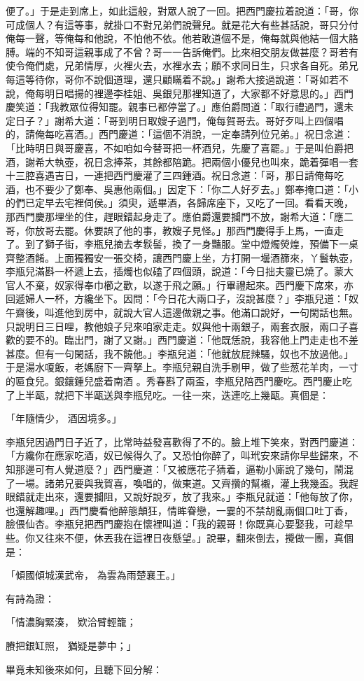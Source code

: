便了。」于是走到席上，如此這般，對眾人說了一回。把西門慶拉着說道：「哥，你可成個人？有這等事，就掛口不對兄弟們說聲兒。就是花大有些甚話說，哥只分付俺每一聲，等俺每和他說，不怕他不依。他若敢道個不是，俺每就與他結一個大胳膊。端的不知哥這親事成了不曾？哥一一告訴俺們。比來相交朋友做甚麼？哥若有使令俺們處，兄弟情厚，火裡火去，水裡水去；願不求同日生，只求各自死。弟兄每這等待你，哥你不說個道理，還只顧瞞着不說。」謝希大接過說道：「哥如若不說，俺每明日唱揚的裡邊李桂姐、吳銀兒那裡知道了，大家都不好意思的。」西門慶笑道：「我教眾位得知罷。親事已都停當了。」應伯爵問道：「取行禮過門，還未定日子？」謝希大道：「哥到明日取嫂子過門，俺每賀哥去。哥好歹叫上四個唱的，請俺每吃喜酒。」西門慶道：「這個不消說，一定奉請列位兄弟。」祝日念道：「比時明日與哥慶喜，不如咱如今替哥把一杯酒兒，先慶了喜罷。」于是叫伯爵把酒，謝希大執壺，祝日念捧茶，其餘都陪跪。把兩個小優兒也叫來，跪着彈唱一套十三腔喜遇吉日，一連把西門慶灌了三四鍾酒。祝日念道：「哥，那日請俺每吃酒，也不要少了鄭奉、吳惠他兩個。」因定下：「你二人好歹去。」鄭奉掩口道：「小的們已定早去宅裡伺侯。」須臾，遞畢酒，各歸席座下，又吃了一回。看看天晚，那西門慶那埋坐的住，趕眼錯起身走了。應伯爵還要攔門不放，謝希大道：「應二哥，你放哥去罷。休要誤了他的事，教嫂子見怪。」那西門慶得手上馬，一直走了。到了獅子街，李瓶兒摘去孝䯼髻，換了一身豔服。堂中燈燭熒煌，預備下一桌齊整酒餚。上面獨獨安一張交椅，讓西門慶上坐，方打開一壜酒篩來，丫鬟執壺，李瓶兒滿斟一杯遞上去，插燭也似磕了四個頭，說道：「今日拙夫靈已燒了。蒙大官人不棄，奴家得奉巾櫛之歡，以遂于飛之願。」行畢禮起來。西門慶下席來，亦回遞婦人一杯，方纔坐下。因問：「今日花大兩口子，沒說甚麼？」李瓶兒道：「奴午齋後，叫進他到房中，就說大官人這邊做親之事。他滿口說好，一句閑話也無。只說明日三日哩，教他娘子兒來咱家走走。奴與他十兩銀子，兩套衣服，兩口子喜歡的要不的。臨出門，謝了又謝。」西門慶道：「他既恁說，我容他上門走走也不差甚麼。但有一句閑話，我不饒他。」李瓶兒道：「他就放屁辣騷，奴也不放過他。」于是湯水嗄飯，老媽廚下一齊拏上。李瓶兒親自洗手剔甲，做了些葱花羊肉，一寸的匾食兒。銀鑲鍾兒盛着南酒 。秀春斟了兩盃，李瓶兒陪西門慶吃。西門慶止吃了上半甌，就把下半甌送與李瓶兒吃。一往一來，迭連吃上幾甌。真個是：

「年隨情少，  酒因境多。」

李瓶兒因過門日子近了，比常時益發喜歡得了不的。臉上堆下笑來，對西門慶道：「方纔你在應家吃酒，奴已候得久了。又恐怕你醉了，叫玳安來請你早些歸來，不知那邊可有人覺道麼？」西門慶道：「又被應花子猜着，逼勒小廝說了幾句，鬧混了一場。諸弟兄要與我賀喜，喚唱的，做東道。又齊攢的幫襯，灌上我幾盃。我趕眼錯就走出來，還要攔阻，又說好說歹，放了我來。」李瓶兒就道：「他每放了你，也還解趣哩。」西門慶看他醉態顛狂，情眸眷戀，一霎的不禁胡亂兩個口吐丁香，臉偎仙杏。李瓶兒把西門慶抱在懷裡叫道：「我的親哥！你既真心要娶我，可趁早些。你又往來不便，休丟我在這裡日夜懸望。」說畢，翻來倒去，攪做一團，真個是：

「傾國傾城漢武帝，  為雲為雨楚襄王。」

有詩為證：

「情濃胸緊湊，  欵洽臂輕籠；

賸把銀缸照，  猶疑是夢中；」

畢竟未知後來如何，且聽下回分解：
